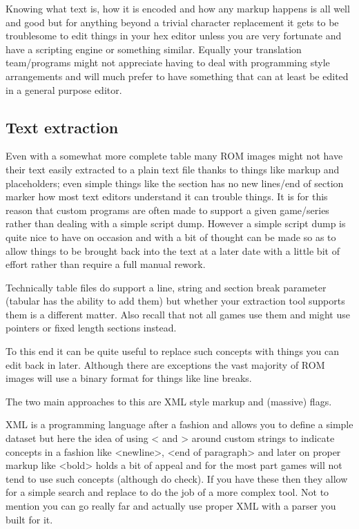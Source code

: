 \documentclass[
]{book}
\begin{document}
Knowing what text is, how it is encoded and how any markup happens is all well and good but for anything beyond a trivial character replacement it gets to be troublesome to edit things in your hex editor unless you are very fortunate and have a scripting engine or something similar. Equally your translation team/programs might not appreciate having to deal with programming style arrangements and will much prefer to have something that can at least be edited in a general purpose editor.

\hypertarget{text-extraction}{%
\subsection{Text extraction}\label{text-extraction}}

Even with a somewhat more complete table many ROM images might not have their text easily extracted to a plain text file thanks to things like markup and placeholders; even simple things like the section has no new lines/end of section marker how most text editors understand it can trouble things. It is for this reason that custom programs are often made to support a given game/series rather than dealing with a simple script dump. However a simple script dump is quite nice to have on occasion and with a bit of thought can be made so as to allow things to be brought back into the text at a later date with a little bit of effort rather than require a full manual rework.

Technically table files do support a line, string and section break parameter (tabular has the ability to add them) but whether your extraction tool supports them is a different matter. Also recall that not all games use them and might use pointers or fixed length sections instead.

To this end it can be quite useful to replace such concepts with things you can edit back in later. Although there are exceptions the vast majority of ROM images will use a binary format for things like line breaks.

The two main approaches to this are XML style markup and (massive) flags.

XML is a programming language after a fashion and allows you to define a simple dataset but here the idea of using \textless{} and \textgreater{} around custom strings to indicate concepts in a fashion like \textless newline\textgreater, \textless end of paragraph\textgreater{} and later on proper markup like \textless bold\textgreater{} holds a bit of appeal and for the most part games will not tend to use such concepts (although do check). If you have these then they allow for a simple search and replace to do the job of a more complex tool. Not to mention you can go really far and actually use proper XML with a parser you built for it.
\end{document}
